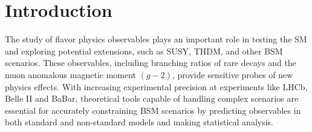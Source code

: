 \documentclass[preprint,11pt]{elsarticle}
\begin{document}

\section{Introduction}

The study of flavor physics observables plays an important role in testing the SM and exploring potential extensions, such as SUSY, THDM, and other BSM scenarios. These observables, including branching ratios of rare decays and the muon anomalous magnetic moment \((g-2)\), provide sensitive probes of new physics effects. With increasing experimental precision at experiments like LHCb, Belle II and BaBar, theoretical tools capable of handling complex scenarios are essential for accurately constraining BSM scenarios by predicting observables in both standard and non-standard models and making statistical analysis.
\end{document}
